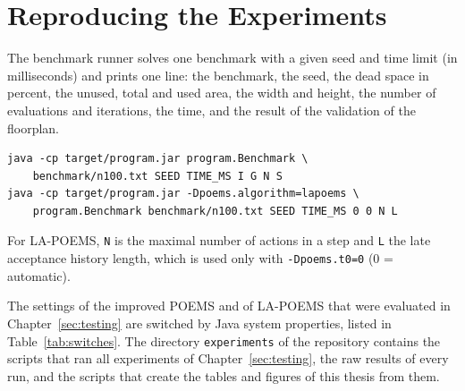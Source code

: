 \section{Reproducing the Experiments}

The benchmark runner solves one benchmark with a given seed and time limit (in milliseconds) and prints one line: the benchmark, the seed, the dead space in percent, the unused, total and used area, the width and height, the number of evaluations and iterations, the time, and the result of the validation of the floorplan.

\begin{verbatim}
java -cp target/program.jar program.Benchmark \
    benchmark/n100.txt SEED TIME_MS I G N S
java -cp target/program.jar -Dpoems.algorithm=lapoems \
    program.Benchmark benchmark/n100.txt SEED TIME_MS 0 0 N L
\end{verbatim}

For LA-POEMS, {\tt N} is the maximal number of actions in a step and {\tt L} the late acceptance history length, which is used only with {\tt -Dpoems.t0=0} (0 = automatic).

The settings of the improved POEMS and of LA-POEMS that were evaluated in Chapter~\ref{sec:testing} are switched by Java system properties, listed in Table~\ref{tab:switches}. The directory {\tt experiments} of the repository \cite{repository} contains the scripts that ran all experiments of Chapter~\ref{sec:testing}, the raw results of every run, and the scripts that create the tables and figures of this thesis from them.


